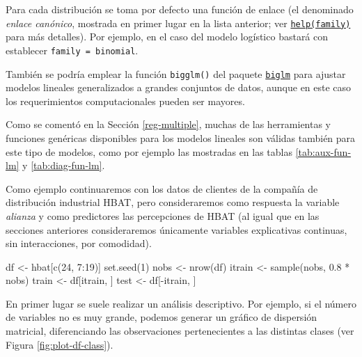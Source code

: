 \documentclass[
]{book}
\newenvironment{Shaded}{\begin{snugshade}}{\end{snugshade}}
\newcommand{\DecValTok}[1]{\textcolor[rgb]{0.00,0.00,0.81}{#1}}
\newcommand{\FloatTok}[1]{\textcolor[rgb]{0.00,0.00,0.81}{#1}}
\newcommand{\FunctionTok}[1]{\textcolor[rgb]{0.00,0.00,0.00}{#1}}
\newcommand{\NormalTok}[1]{#1}
\newcommand{\OtherTok}[1]{\textcolor[rgb]{0.56,0.35,0.01}{#1}}
\newcommand{\SpecialCharTok}[1]{\textcolor[rgb]{0.00,0.00,0.00}{#1}}
\theoremstyle{break}
\theoremstyle{nonumberplain}
\begin{document}
Para cada distribución se toma por defecto una función de enlace (el denominado \emph{enlace canónico}, mostrada en primer lugar en la lista anterior; ver \href{https://rdrr.io/r/stats/family.html}{\texttt{help(family)}} para más detalles).
Por ejemplo, en el caso del modelo logístico bastará con establecer \texttt{family\ =\ binomial}.

También se podría emplear la función \texttt{bigglm()} del paquete \href{https://CRAN.R-project.org/package=biglm}{\texttt{biglm}} para ajustar modelos lineales generalizados a grandes conjuntos de datos, aunque en este caso los requerimientos computacionales pueden ser mayores.

Como se comentó en la Sección \ref{reg-multiple}, muchas de las herramientas y funciones genéricas disponibles para los modelos lineales son válidas también para este tipo de modelos, como por ejemplo las mostradas en las tablas \ref{tab:aux-fun-lm} y \ref{tab:diag-fun-lm}.

Como ejemplo continuaremos con los datos de clientes de la compañía de distribución industrial HBAT, pero consideraremos como respuesta la variable \emph{alianza} y como predictores las percepciones de HBAT (al igual que en las secciones anteriores consideraremos únicamente variables explicativas continuas, sin interacciones, por comodidad).

\begin{Shaded}
\begin{Highlighting}[]
\NormalTok{df }\OtherTok{\textless{}{-}}\NormalTok{ hbat[}\FunctionTok{c}\NormalTok{(}\DecValTok{24}\NormalTok{, }\DecValTok{7}\SpecialCharTok{:}\DecValTok{19}\NormalTok{)]}
\FunctionTok{set.seed}\NormalTok{(}\DecValTok{1}\NormalTok{)}
\NormalTok{nobs }\OtherTok{\textless{}{-}} \FunctionTok{nrow}\NormalTok{(df)}
\NormalTok{itrain }\OtherTok{\textless{}{-}} \FunctionTok{sample}\NormalTok{(nobs, }\FloatTok{0.8} \SpecialCharTok{*}\NormalTok{ nobs)}
\NormalTok{train }\OtherTok{\textless{}{-}}\NormalTok{ df[itrain, ]}
\NormalTok{test }\OtherTok{\textless{}{-}}\NormalTok{ df[}\SpecialCharTok{{-}}\NormalTok{itrain, ]}
\end{Highlighting}
\end{Shaded}

En primer lugar se suele realizar un análisis descriptivo.
Por ejemplo, si el número de variables no es muy grande, podemos generar un gráfico de dispersión matricial, diferenciando las observaciones pertenecientes a las distintas clases (ver Figura \ref{fig:plot-df-class}).
\end{document}
